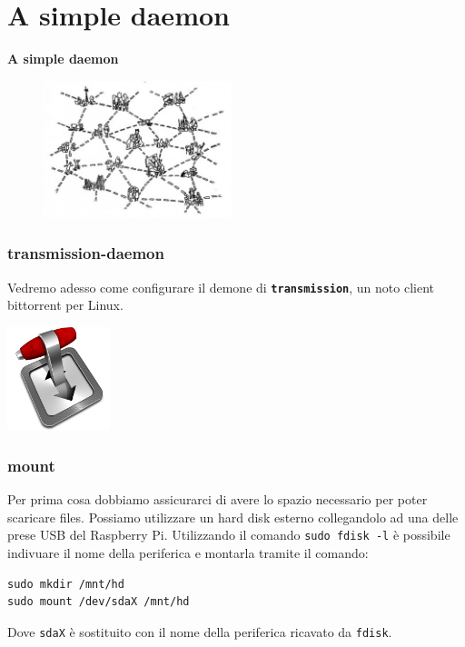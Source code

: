 \documentclass[xcolor=svgnames,11pt]{beamer}
\begin{document}
\section{A simple daemon}
\begin{frame}{}
\begin{center}
\begin{Huge}
{\color{green_raspi} \textbf{A simple daemon}}
\end{Huge}
\begin{figure}
\includegraphics[height=4cm]{meme6.jpg}
\end{figure}
\end{center}
\end{frame}

\begin{frame}\frametitle{transmission-daemon}
Vedremo adesso come configurare il demone di \texttt{\textbf{transmission}}, un noto client bittorrent per Linux.
\medskip
\begin{center}
\includegraphics[width=3cm]{transmission-icon.png}
\end{center}
\end{frame}

\begin{frame}[fragile]\frametitle{mount}
Per prima cosa dobbiamo assicurarci di avere lo spazio necessario per poter scaricare files. Possiamo utilizzare un hard disk esterno collegandolo ad una delle prese USB del Raspberry Pi.
\medskip
Utilizzando il comando \texttt{sudo fdisk -l} \`e possibile indivuare il nome della periferica e montarla tramite il comando:
\begin{block}{}
\begin{verbatim}
sudo mkdir /mnt/hd
sudo mount /dev/sdaX /mnt/hd
\end{verbatim}
\end{block}

\medskip
Dove \texttt{sdaX} \`e sostituito con il nome della periferica ricavato da \texttt{fdisk}.
\end{frame}
\end{document}
